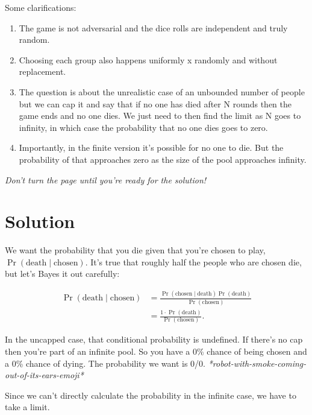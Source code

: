 \documentclass[article,twocolumn]{memoir}
\begin{document}
\newpage

Some clarifications:

\begin{enumerate}
\item The game is not adversarial and the dice rolls are independent and truly random.
\item Choosing each group also happens uniformly x randomly and without replacement.
\item The question is about the unrealistic case of an unbounded number of people but we can cap it and say that if no one has died after N rounds then the game ends and no one dies. 
We just need to then find the limit as N goes to infinity, in which case the probability that no one dies goes to zero.
\item Importantly, in the finite version it's possible for no one to die. 
But the probability of that approaches zero as the size of the pool approaches infinity.
\end{enumerate}

\emph{Don't turn the page until you're ready for the solution!}

\newpage

\chapter*{Solution}

We want the probability that you die given that you're chosen to play, 
$\Pr(\text{death} \mid \text{chosen})$.
It's true that roughly half the people who are chosen die, but let's Bayes it out carefully:

\begin{equation}
\begin{split}
\Pr(\text{death} \mid \text{chosen}) & =
\frac{\Pr(\text{chosen} \mid \text{death}) \Pr(\text{death})}{\Pr(\text{chosen})} \\
& = \frac{1\cdot\Pr(\text{death})}{\Pr(\text{chosen})}.
\end{split}
\end{equation}

In the uncapped case, that conditional probability is undefined. 
If there's no cap then you're part of an infinite pool. 
So you have a 0\% chance of being chosen and a 0\% chance of dying. 
The probability we want is 0/0. 
\emph{*robot-with-smoke-coming-out-of-its-ears-emoji*}

Since we can't directly calculate the probability in the infinite case, we have to take a limit.
\end{document}
